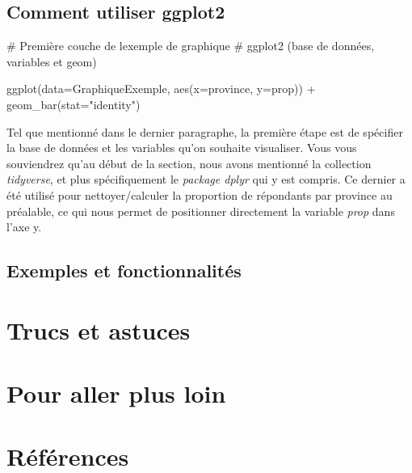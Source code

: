 \documentclass[
  letterpaper,
]{scrbook}
\newenvironment{Shaded}{\begin{snugshade}}{\end{snugshade}}
\newcommand{\AttributeTok}[1]{\textcolor[rgb]{0.40,0.45,0.13}{#1}}
\newcommand{\CommentTok}[1]{\textcolor[rgb]{0.37,0.37,0.37}{#1}}
\newcommand{\FunctionTok}[1]{\textcolor[rgb]{0.28,0.35,0.67}{#1}}
\newcommand{\NormalTok}[1]{\textcolor[rgb]{0.00,0.23,0.31}{#1}}
\newcommand{\SpecialCharTok}[1]{\textcolor[rgb]{0.37,0.37,0.37}{#1}}
\newcommand{\StringTok}[1]{\textcolor[rgb]{0.13,0.47,0.30}{#1}}
\begin{document}
\hypertarget{comment-utiliser-ggplot2}{%
\subsection{Comment utiliser ggplot2}\label{comment-utiliser-ggplot2}}

\begin{Shaded}
\begin{Highlighting}[]
\CommentTok{\# Première couche de l\textquotesingle{}exemple de graphique}
\CommentTok{\# ggplot2 (base de données, variables et geom)}

\FunctionTok{ggplot}\NormalTok{(}\AttributeTok{data=}\NormalTok{GraphiqueExemple, }\FunctionTok{aes}\NormalTok{(}\AttributeTok{x=}\NormalTok{province, }\AttributeTok{y=}\NormalTok{prop)) }\SpecialCharTok{+}
  \FunctionTok{geom\_bar}\NormalTok{(}\AttributeTok{stat=}\StringTok{"identity"}\NormalTok{) }
\end{Highlighting}
\end{Shaded}

Tel que mentionné dans le dernier paragraphe, la première étape est de
spécifier la base de données et les variables qu'on souhaite visualiser.
Vous vous souviendrez qu'au début de la section, nous avons mentionné la
collection \emph{tidyverse}, et plus spécifiquement le \emph{package
dplyr} qui y est compris. Ce dernier a été utilisé pour
nettoyer/calculer la proportion de répondants par province au préalable,
ce qui nous permet de positionner directement la variable \emph{prop}
dans l'axe y.

\hypertarget{exemples-et-fonctionnalituxe9s}{%
\subsection{Exemples et
fonctionnalités}\label{exemples-et-fonctionnalituxe9s}}

\hypertarget{trucs-et-astuces}{%
\section{Trucs et astuces}\label{trucs-et-astuces}}

\hypertarget{pour-aller-plus-loin}{%
\section{Pour aller plus loin}\label{pour-aller-plus-loin}}

\clearpage

\hypertarget{ruxe9fuxe9rences-1}{%
\section{Références}\label{ruxe9fuxe9rences-1}}
\end{document}
